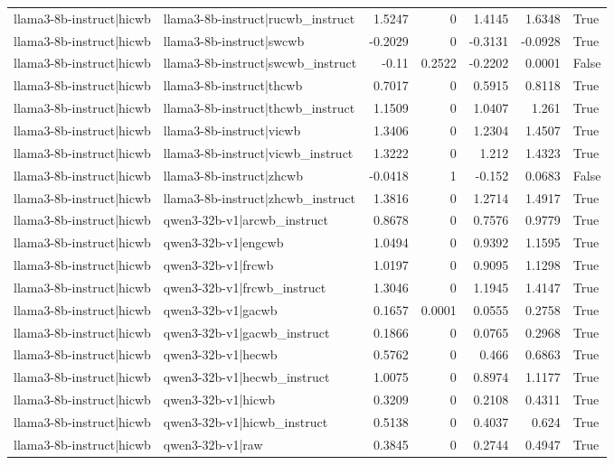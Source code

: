 \begin{table}
\begin{tabular}{l l r r r r l}
llama3-8b-instruct|hicwb & llama3-8b-instruct|rucwb_instruct & 1.5247 & 0 & 1.4145 & 1.6348 & True \\
llama3-8b-instruct|hicwb & llama3-8b-instruct|swcwb & -0.2029 & 0 & -0.3131 & -0.0928 & True \\
llama3-8b-instruct|hicwb & llama3-8b-instruct|swcwb_instruct & -0.11 & 0.2522 & -0.2202 & 0.0001 & False \\
llama3-8b-instruct|hicwb & llama3-8b-instruct|thcwb & 0.7017 & 0 & 0.5915 & 0.8118 & True \\
llama3-8b-instruct|hicwb & llama3-8b-instruct|thcwb_instruct & 1.1509 & 0 & 1.0407 & 1.261 & True \\
llama3-8b-instruct|hicwb & llama3-8b-instruct|vicwb & 1.3406 & 0 & 1.2304 & 1.4507 & True \\
llama3-8b-instruct|hicwb & llama3-8b-instruct|vicwb_instruct & 1.3222 & 0 & 1.212 & 1.4323 & True \\
llama3-8b-instruct|hicwb & llama3-8b-instruct|zhcwb & -0.0418 & 1 & -0.152 & 0.0683 & False \\
llama3-8b-instruct|hicwb & llama3-8b-instruct|zhcwb_instruct & 1.3816 & 0 & 1.2714 & 1.4917 & True \\
llama3-8b-instruct|hicwb & qwen3-32b-v1|arcwb_instruct & 0.8678 & 0 & 0.7576 & 0.9779 & True \\
llama3-8b-instruct|hicwb & qwen3-32b-v1|engcwb & 1.0494 & 0 & 0.9392 & 1.1595 & True \\
llama3-8b-instruct|hicwb & qwen3-32b-v1|frcwb & 1.0197 & 0 & 0.9095 & 1.1298 & True \\
llama3-8b-instruct|hicwb & qwen3-32b-v1|frcwb_instruct & 1.3046 & 0 & 1.1945 & 1.4147 & True \\
llama3-8b-instruct|hicwb & qwen3-32b-v1|gacwb & 0.1657 & 0.0001 & 0.0555 & 0.2758 & True \\
llama3-8b-instruct|hicwb & qwen3-32b-v1|gacwb_instruct & 0.1866 & 0 & 0.0765 & 0.2968 & True \\
llama3-8b-instruct|hicwb & qwen3-32b-v1|hecwb & 0.5762 & 0 & 0.466 & 0.6863 & True \\
llama3-8b-instruct|hicwb & qwen3-32b-v1|hecwb_instruct & 1.0075 & 0 & 0.8974 & 1.1177 & True \\
llama3-8b-instruct|hicwb & qwen3-32b-v1|hicwb & 0.3209 & 0 & 0.2108 & 0.4311 & True \\
llama3-8b-instruct|hicwb & qwen3-32b-v1|hicwb_instruct & 0.5138 & 0 & 0.4037 & 0.624 & True \\
llama3-8b-instruct|hicwb & qwen3-32b-v1|raw & 0.3845 & 0 & 0.2744 & 0.4947 & True \\

\end{tabular}
\end{table}
